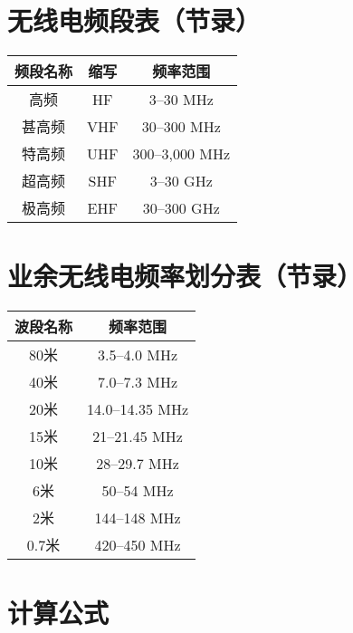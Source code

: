\newpage

\section{无线电频段表（节录）}

\begin{longtable}{|c|c|c|}
	\hline
	\textbf{频段名称} & \textbf{缩写} & \textbf{频率范围} \\
	\hline
	高频 & HF & 3–30 MHz \\
	\hline
	甚高频 & VHF & 30–300 MHz \\
	\hline
	特高频 & UHF & 300–3,000 MHz \\
	\hline
	超高频 & SHF & 3–30 GHz \\
	\hline
	极高频 & EHF & 30–300 GHz \\
	\hline
\end{longtable}

\newpage






\section{业余无线电频率划分表（节录）}


\begin{longtable}{|c|c|}
	\hline
	\textbf{波段名称} & \textbf{频率范围} \\
	\hline
	80米 & 3.5–4.0 MHz \\
	\hline
	40米 & 7.0–7.3 MHz \\
	\hline
	20米 & 14.0–14.35 MHz \\
	\hline
	15米 & 21–21.45 MHz \\
	\hline
	10米 & 28–29.7 MHz \\
	\hline
	6米 & 50–54 MHz \\
	\hline
	2米 & 144–148 MHz \\
	\hline
	0.7米 & 420–450 MHz \\
	\hline
\end{longtable}

\newpage

\section{计算公式}




\newpage

